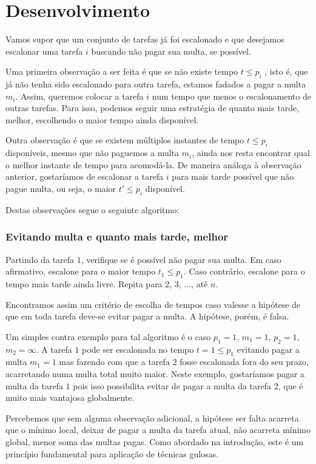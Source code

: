 \section{Desenvolvimento}

Vamos supor que um conjunto de tarefas já foi escalonado e que desejamos escalonar uma tarefa $i$ buscando não pagar sua multa, se possível.

Uma primeira observação a ser feita é que se não existe tempo $t \leq p_i$ , isto é, que já não tenha sido escalonado para outra tarefa, estamos fadados a pagar a multa $m_i$. Assim, queremos colocar a tarefa $i$ num tempo que menos  o escalonamento de outras tarefas. Para isso, podemos seguir uma estratégia de quanto mais tarde, melhor, escolhendo o maior tempo ainda disponível.

Outra observação é que se existem múltiplos instantes de tempo $t \leq p_i$ disponíveis, mesmo que não paguemos a multa $m_i$, ainda nos resta encontrar qual o melhor instante de tempo para acomodá-la. De maneira análoga à observação anterior, gostaríamos de escalonar a tarefa $i$ para mais tarde possível que não pague multa, ou seja, o maior $t' \leq p_i$ disponível.

Destas observações segue o seguinte algoritmo:

\subsubsection*{Evitando multa e quanto mais tarde, melhor}

Partindo da tarefa $1$, verifique se é possível não pagar sua multa. Em caso afirmativo, escalone para o maior tempo $t_1 \leq p_1$. Caso contrário, escalone para o tempo mais tarde ainda livre. Repita para $2$, $3$, ..., até $n$.

Encontramos assim um critério de escolha de tempos caso valesse a hipótese de que em toda tarefa deve-se evitar pagar a multa. A hipótese, porém, é falsa.

Um simples contra exemplo para tal algoritmo é o caso $p_1 = 1$, $m_1 = 1$, $p_2 = 1$, $m_2 = \infty$. A tarefa $1$ pode ser escalonada no tempo $t = 1 \leq p_1$ evitando pagar a multa $m_1 = 1$ mas fazendo com que a tarefa $2$ fosse escalonada fora do seu prazo, acarretando numa multa total muito maior. Neste exemplo, gostaríamos pagar a multa da tarefa $1$ pois isso possibilita evitar de pagar a multa da tarefa $2$, que é muito mais vantajosa globalmente.

Percebemos que sem alguma observação adicional, a hipótese ser falta acarreta que o mínimo local, deixar de pagar a multa da tarefa atual, não acarreta mínimo global, menor soma das multas pagas. Como abordado na introdução, este é um princípio fundamental para aplicação de técnicas gulosas.


